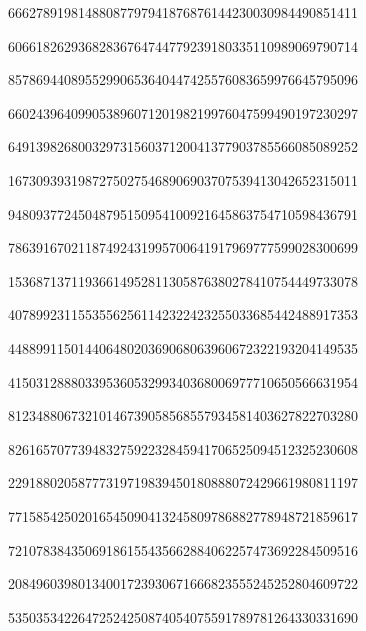\begin{center}
66627891981488087797941876876144230030984490851411

60661826293682836764744779239180335110989069790714

85786944089552990653640447425576083659976645795096

66024396409905389607120198219976047599490197230297

64913982680032973156037120041377903785566085089252

16730939319872750275468906903707539413042652315011

94809377245048795150954100921645863754710598436791

78639167021187492431995700641917969777599028300699

15368713711936614952811305876380278410754449733078

40789923115535562561142322423255033685442488917353

44889911501440648020369068063960672322193204149535

41503128880339536053299340368006977710650566631954

81234880673210146739058568557934581403627822703280

82616570773948327592232845941706525094512325230608

22918802058777319719839450180888072429661980811197

77158542502016545090413245809786882778948721859617

72107838435069186155435662884062257473692284509516

20849603980134001723930671666823555245252804609722

53503534226472524250874054075591789781264330331690
\end{center}
